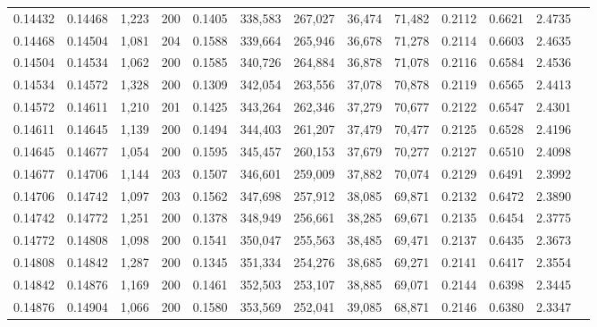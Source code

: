 \begin{tabular}{rrrrrrrrrrrrr}
0.14432 & 0.14468 & 1,223 & 200 &                                     0.1405 & 338,583 & 267,027 &  36,474 &  71,482 & 0.2112 & 0.6621 & 2.4735 \\
0.14468 & 0.14504 & 1,081 & 204 &                                     0.1588 & 339,664 & 265,946 &  36,678 &  71,278 & 0.2114 & 0.6603 & 2.4635 \\
0.14504 & 0.14534 & 1,062 & 200 &                                     0.1585 & 340,726 & 264,884 &  36,878 &  71,078 & 0.2116 & 0.6584 & 2.4536 \\
0.14534 & 0.14572 & 1,328 & 200 &                                     0.1309 & 342,054 & 263,556 &  37,078 &  70,878 & 0.2119 & 0.6565 & 2.4413 \\
0.14572 & 0.14611 & 1,210 & 201 &                                     0.1425 & 343,264 & 262,346 &  37,279 &  70,677 & 0.2122 & 0.6547 & 2.4301 \\
0.14611 & 0.14645 & 1,139 & 200 &                                     0.1494 & 344,403 & 261,207 &  37,479 &  70,477 & 0.2125 & 0.6528 & 2.4196 \\
0.14645 & 0.14677 & 1,054 & 200 &                                     0.1595 & 345,457 & 260,153 &  37,679 &  70,277 & 0.2127 & 0.6510 & 2.4098 \\
0.14677 & 0.14706 & 1,144 & 203 &                                     0.1507 & 346,601 & 259,009 &  37,882 &  70,074 & 0.2129 & 0.6491 & 2.3992 \\
0.14706 & 0.14742 & 1,097 & 203 &                                     0.1562 & 347,698 & 257,912 &  38,085 &  69,871 & 0.2132 & 0.6472 & 2.3890 \\
0.14742 & 0.14772 & 1,251 & 200 &                                     0.1378 & 348,949 & 256,661 &  38,285 &  69,671 & 0.2135 & 0.6454 & 2.3775 \\
0.14772 & 0.14808 & 1,098 & 200 &                                     0.1541 & 350,047 & 255,563 &  38,485 &  69,471 & 0.2137 & 0.6435 & 2.3673 \\
0.14808 & 0.14842 & 1,287 & 200 &                                     0.1345 & 351,334 & 254,276 &  38,685 &  69,271 & 0.2141 & 0.6417 & 2.3554 \\
0.14842 & 0.14876 & 1,169 & 200 &                                     0.1461 & 352,503 & 253,107 &  38,885 &  69,071 & 0.2144 & 0.6398 & 2.3445 \\
0.14876 & 0.14904 & 1,066 & 200 &                                     0.1580 & 353,569 & 252,041 &  39,085 &  68,871 & 0.2146 & 0.6380 & 2.3347 \\

\end{tabular}

